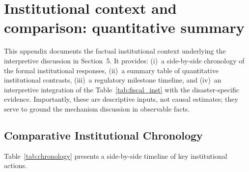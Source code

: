 %

\renewcommand{\thetable}{E.\arabic{table}}
\setcounter{table}{13}
\setcounter{subsection}{0}

\section{Institutional context and comparison: quantitative summary}

This appendix documents the factual institutional context underlying the interpretive discussion in Section~5. It provides: (i)~a side-by-side chronology of the formal institutional responses, (ii)~a summary table of quantitative institutional contrasts, (iii)~a regulatory milestone timeline, and (iv)~an interpretive integration of the Table~\ref{tab:fiscal_inst} with the disaster-specific evidence. Importantly, these are descriptive inputs, not causal estimates; they serve to ground the mechanism discussion in observable facts.


\subsection{Comparative Institutional Chronology}

Table~\ref{tab:chronology} presents a side-by-side timeline of key institutional actions.

